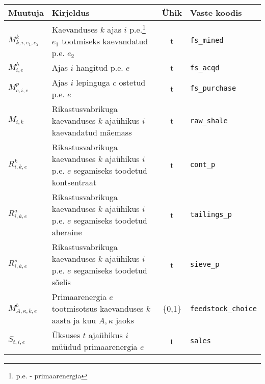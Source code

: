 \begin{landscape}
\begin{longtable}{l l c l}
Muutuja & Kirjeldus & Ühik & Vaste koodis\\
\hline
$M^k_{k,i,e_1, e_2}$ & Kaevanduses $k$ ajas $i$ p.e.\footnote{p.e. - primaarenergia} $e_1$ tootmiseks kaevandatud p.e. $e_2$ & t &  \texttt{fs\_mined}\\
$M^h_{i,e}$ & Ajas $i$ hangitud p.e. $e$ & t &  \texttt{fs\_acqd}\\
$M^p_{c,i,e}$ & Ajas $i$ lepinguga $c$ ostetud p.e. $e$ & t &  \texttt{fs\_purchase}\\

$M_{i,k}$ & Rikastusvabrikuga kaevanduses $k$ ajaühikus $i$ kaevandatud mäemass & t & \texttt{raw\_shale}\\

$R^k_{i,k,e}$& Rikastusvabrikuga kaevanduses $k$ ajaühikus $i$ p.e. $e$ segamiseks toodetud kontsentraat & t & \texttt{cont\_p}\\
$R^a_{i,k,e}$& Rikastusvabrikuga kaevanduses $k$ ajaühikus $i$ p.e. $e$ segamiseks toodetud aheraine & t & \texttt{tailings\_p}\\
$R^s_{i,k,e}$& Rikastusvabrikuga kaevanduses $k$ ajaühikus $i$ p.e. $e$ segamiseks toodetud sõelis & t & \texttt{sieve\_p}\\
$M^b_{A, \kappa, k,e}$ & Primaarenergia $e$ tootmisotsus kaevanduses $k$ aasta ja kuu $A,\kappa$  jaoks &  \{0,1\} & \texttt{feedstock\_choice}\\
$S_{t,i,e}$ & Üksuses $t$ ajaühikus $i$ müüdud primaarenergia $e$ & t & \texttt{sales}\\


\end{longtable}
\end{landscape}
